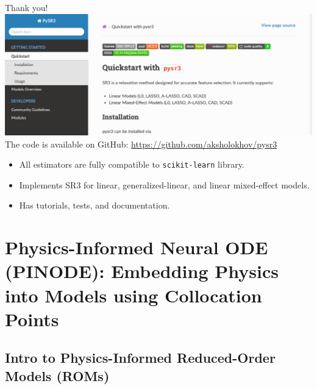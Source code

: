 \documentclass[8pt]{beamer}
\begin{document}
\begin{frame}{Thank you!}
	\includegraphics[width=\textwidth]{Figures/pysr3_screenshot.png}
	The code is available on GitHub: \href{github.com/aksholokhov/pysr3}{https://github.com/aksholokhov/pysr3}
	\begin{itemize}
		\item All estimators are fully compatible to \texttt{scikit-learn} library.
		\item Implements SR3 for linear, generalized-linear, and linear mixed-effect models.
		\item Has tutorials, tests, and documentation.
	\end{itemize}
\end{frame}

\section{Physics-Informed Neural ODE (PINODE): Embedding Physics into Models using Collocation Points}

\subsection{Intro to Physics-Informed Reduced-Order Models (ROMs)}
\end{document}
